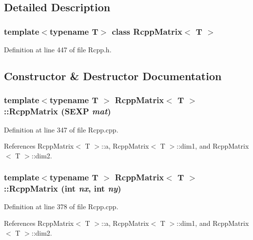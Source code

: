 \subsection{Detailed Description}
\subsubsection*{template$<$typename T$>$ class RcppMatrix$<$ T $>$}



Definition at line 447 of file Rcpp.h.

\subsection{Constructor \& Destructor Documentation}
\hypertarget{classRcppMatrix_a6cdd09180c21b504d1455ae2bc8939a7}{
\subsubsection[{RcppMatrix}]{\setlength{\rightskip}{0pt plus 5cm}template$<$typename T $>$ {\bf RcppMatrix}$<$ T $>$::{\bf RcppMatrix} (SEXP {\em mat})}}
\label{classRcppMatrix_a6cdd09180c21b504d1455ae2bc8939a7}


Definition at line 347 of file Rcpp.cpp.

References RcppMatrix$<$ T $>$::a, RcppMatrix$<$ T $>$::dim1, and RcppMatrix$<$ T $>$::dim2.\hypertarget{classRcppMatrix_a9ac16e2fcccd2a21a33097139e4ec253}{
\subsubsection[{RcppMatrix}]{\setlength{\rightskip}{0pt plus 5cm}template$<$typename T $>$ {\bf RcppMatrix}$<$ T $>$::{\bf RcppMatrix} (int {\em nx}, \/  int {\em ny})}}
\label{classRcppMatrix_a9ac16e2fcccd2a21a33097139e4ec253}


Definition at line 378 of file Rcpp.cpp.

References RcppMatrix$<$ T $>$::a, RcppMatrix$<$ T $>$::dim1, and RcppMatrix$<$ T $>$::dim2.

